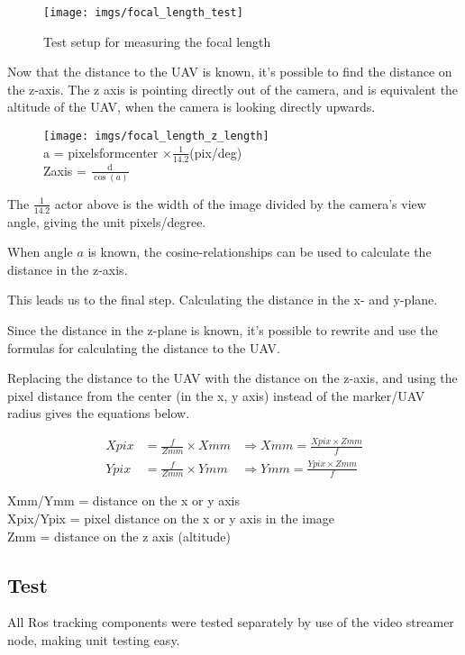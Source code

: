 \begin{figure}[h!]
	\centering
	\texttt{[image: imgs/focal\_length\_test]}
	\caption{Test setup for measuring the focal length}
\end{figure}

Now that the distance to the UAV is known, it's possible to find the distance on the z-axis. The z axis is pointing directly out of the camera, and is equivalent the altitude of the UAV, when the camera is looking directly upwards. 

\begin{figure}[h!]
	\centering
	\texttt{[image: imgs/focal\_length\_z\_length]}\\
	a = pixelsformcenter $ \times \frac{1}{14.2}$(pix/deg)\\
	Zaxis = $\frac{\mathrm{d}}{\cos{(a)}}$
\end{figure}

The $\frac{1}{14.2}$ actor above is the width of the image divided by the camera's view angle, giving the unit pixels/degree.

When angle $a$ is known, the cosine-relationships can be used to calculate the distance in the z-axis.

This leads us to the final step. Calculating the distance in the x- and y-plane.
 
Since the distance in the z-plane is known, it's possible to rewrite and use the formulas for calculating the distance to the UAV. 

Replacing the distance to the UAV with the distance on the z-axis, and using the pixel distance from the center (in the x, y axis) instead of the marker/UAV radius gives the equations below.

\begin{align}
X\mathit{pix}&= \frac{f}{Z\mathit{mm}}\times X\mathit{mm} &\Rightarrow X\mathit{mm}=\frac{X\mathit{pix}\times Z\mathit{mm}}{f}\nonumber\\
Y\mathit{pix}&= \frac{f}{Z\mathit{mm}}\times Y\mathit{mm} &\Rightarrow Ymm=\frac{Ypix\times Zmm}{f}\nonumber
\end{align}
\begin{center}
	Xmm/Ymm = distance on the x or y axis\\
	Xpix/Ypix = pixel distance on the x or y axis in the image\\
	Zmm = distance on the z axis (altitude)
\end{center}
\subsection{Test}
All Ros tracking components were tested separately by use of the video streamer node, making unit testing easy.


